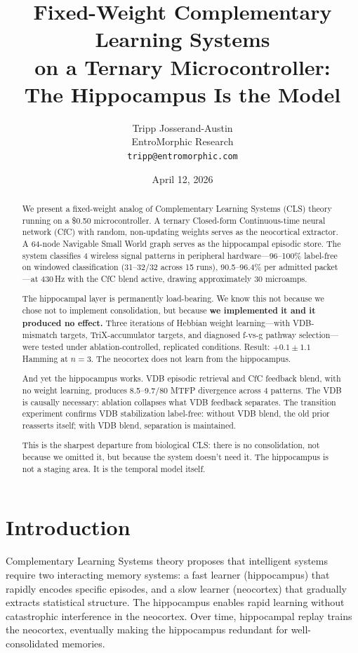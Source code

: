 \documentclass[11pt,letterpaper]{article}
\title{Fixed-Weight Complementary Learning Systems\\on a Ternary Microcontroller:\\The Hippocampus Is the Model}
\author{Tripp Josserand-Austin\\EntroMorphic Research\\\texttt{tripp@entromorphic.com}}
\date{April 12, 2026}
\begin{document}
\maketitle

\begin{abstract}
We present a fixed-weight analog of Complementary Learning Systems (CLS) theory running on a \$0.50 microcontroller. A ternary Closed-form Continuous-time neural network (CfC) with random, non-updating weights serves as the neocortical extractor. A 64-node Navigable Small World graph serves as the hippocampal episodic store. The system classifies 4 wireless signal patterns in peripheral hardware---96--100\% label-free on windowed classification (31--32/32 across 15 runs), 90.5--96.4\% per admitted packet---at 430\,Hz with the CfC blend active, drawing approximately 30 microamps.

The hippocampal layer is permanently load-bearing. We know this not because we chose not to implement consolidation, but because \textbf{we implemented it and it produced no effect.} Three iterations of Hebbian weight learning---with VDB-mismatch targets, TriX-accumulator targets, and diagnosed f-vs-g pathway selection---were tested under ablation-controlled, replicated conditions. Result: $+0.1 \pm 1.1$ Hamming at $n=3$. The neocortex does not learn from the hippocampus.

And yet the hippocampus works. VDB episodic retrieval and CfC feedback blend, with no weight learning, produces 8.5--9.7/80 MTFP divergence across 4 patterns. The VDB is causally necessary: ablation collapses what VDB feedback separates. The transition experiment confirms VDB stabilization label-free: without VDB blend, the old prior reasserts itself; with VDB blend, separation is maintained.

This is the sharpest departure from biological CLS: there is no consolidation, not because we omitted it, but because the system doesn't need it. The hippocampus is not a staging area. It is the temporal model itself.
\end{abstract}

\section{Introduction}

Complementary Learning Systems theory \cite{mcclelland1995} proposes that intelligent systems require two interacting memory systems: a fast learner (hippocampus) that rapidly encodes specific episodes, and a slow learner (neocortex) that gradually extracts statistical structure. The hippocampus enables rapid learning without catastrophic interference in the neocortex. Over time, hippocampal replay trains the neocortex, eventually making the hippocampus redundant for well-consolidated memories.
\end{document}
